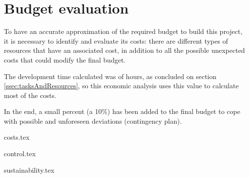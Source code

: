 \section{Budget evaluation}
\label{sec:budget}
To have an accurate approximation of the required budget to build this project, it is necessary to identify and evaluate its costs: there are different types of resources that have an associated cost, in addition to all the possible unexpected costs that could modify the final budget.

The development time calculated was of \the\value{totalFinalHours} hours, as concluded on section \ref{ssec:tasksAndResources}, so this economic analysis uses this value to calculate most of the costs.

In the end, a small percent (a 10\%) has been added to the final budget to cope with possible and unforeseen deviations (contingency plan).

{costs.tex}

\pagebreak
{control.tex}

\pagebreak

{sustainability.tex}